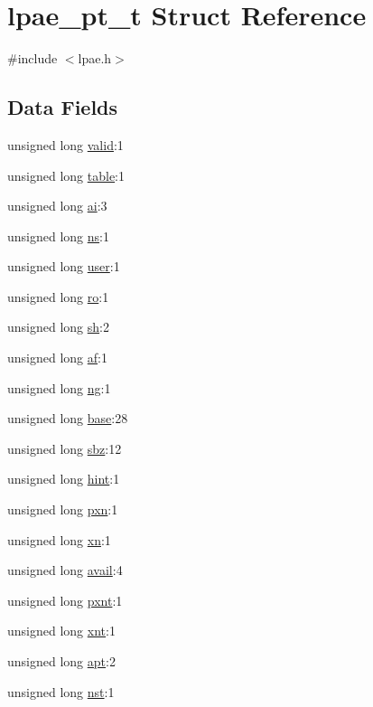 \hypertarget{structlpae__pt__t}{\section{lpae\-\_\-pt\-\_\-t \-Struct \-Reference}
\label{structlpae__pt__t}
}


{\ttfamily \#include $<$lpae.\-h$>$}

\subsection*{\-Data \-Fields}
\begin{DoxyCompactItemize}
\item 
unsigned long \hyperlink{structlpae__pt__t_a7bcbc21e402fb9e3dc07789d414ef17c}{valid}\-:1
\item 
unsigned long \hyperlink{structlpae__pt__t_afe6d8cf4d4c78126d82831e6d5ef5483}{table}\-:1
\item 
unsigned long \hyperlink{structlpae__pt__t_ab49c18e57563921295ef8942744109e9}{ai}\-:3
\item 
unsigned long \hyperlink{structlpae__pt__t_a0c9a7685114f88cfb4cc879031ccd9c2}{ns}\-:1
\item 
unsigned long \hyperlink{structlpae__pt__t_a410008f6ab71b4ad6f00e5a0aa591f8a}{user}\-:1
\item 
unsigned long \hyperlink{structlpae__pt__t_aab6cd914c5bb4ca31f78a11024e97a05}{ro}\-:1
\item 
unsigned long \hyperlink{structlpae__pt__t_a8388cd14eb45903279fca66cedfa5ec7}{sh}\-:2
\item 
unsigned long \hyperlink{structlpae__pt__t_a0f5634df96396057ace3b5f21b1cb381}{af}\-:1
\item 
unsigned long \hyperlink{structlpae__pt__t_a7e9b55fee8cbf4a7f95905d93b8eb8f6}{ng}\-:1
\item 
unsigned long \hyperlink{structlpae__pt__t_a74f95eab64fb23344e30879684489f6f}{base}\-:28
\item 
unsigned long \hyperlink{structlpae__pt__t_ae5b1c215d1172ca33cb4cc70b4484406}{sbz}\-:12
\item 
unsigned long \hyperlink{structlpae__pt__t_a6b9526601b3748535699c90ec4d83a70}{hint}\-:1
\item 
unsigned long \hyperlink{structlpae__pt__t_ac47dd62f5bdb2c1f62fe7a83f23b8902}{pxn}\-:1
\item 
unsigned long \hyperlink{structlpae__pt__t_a14c376b2856f5d0a79874df679a35d94}{xn}\-:1
\item 
unsigned long \hyperlink{structlpae__pt__t_a09631255ee08cc058acd8bc1caff188c}{avail}\-:4
\item 
unsigned long \hyperlink{structlpae__pt__t_a23cf82105349863d2f84c49d7410180a}{pxnt}\-:1
\item 
unsigned long \hyperlink{structlpae__pt__t_a8fc352a6df3247a0039ad7dccaf666d8}{xnt}\-:1
\item 
unsigned long \hyperlink{structlpae__pt__t_a27acf8b422b08ad2eee782c2cd01f1df}{apt}\-:2
\item 
unsigned long \hyperlink{structlpae__pt__t_adb22eee76377f57c572e33df1a66a27a}{nst}\-:1
\end{DoxyCompactItemize}


